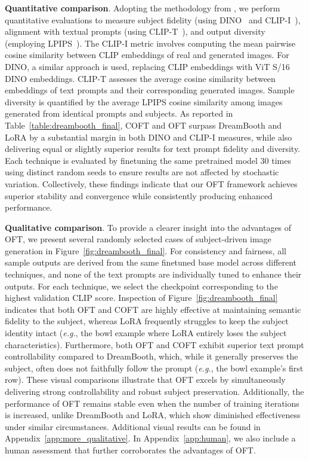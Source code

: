 \textbf{Quantitative comparison}. Adopting the methodology from \cite{ruiz2023dreambooth}, we perform quantitative evaluations to measure subject fidelity (using DINO~\cite{caron2021emerging} and CLIP-I~\cite{radford2021learning}), alignment with textual prompts (using CLIP-T~\cite{radford2021learning}), and output diversity (employing LPIPS~\cite{zhang2018unreasonable}). The CLIP-I metric involves computing the mean pairwise cosine similarity between CLIP embeddings of real and generated images. For DINO, a similar approach is used, replacing CLIP embeddings with ViT S/16 DINO embeddings. CLIP-T assesses the average cosine similarity between embeddings of text prompts and their corresponding generated images. Sample diversity is quantified by the average LPIPS cosine similarity among images generated from identical prompts and subjects. As reported in Table~\ref{table:dreambooth_final}, COFT and OFT surpass DreamBooth and LoRA by a substantial margin in both DINO and CLIP-I measures, while also delivering equal or slightly superior results for text prompt fidelity and diversity. Each technique is evaluated by finetuning the same pretrained model 30 times using distinct random seeds to ensure results are not affected by stochastic variation. Collectively, these findings indicate that our OFT framework achieves superior stability and convergence while consistently producing enhanced performance.

\textbf{Qualitative comparison}. To provide a clearer insight into the advantages of OFT, we present several randomly selected cases of subject-driven image generation in Figure~\ref{fig:dreambooth_final}. For consistency and fairness, all sample outputs are derived from the same finetuned base model across different techniques, and none of the text prompts are individually tuned to enhance their outputs. For each technique, we select the checkpoint corresponding to the highest validation CLIP score. Inspection of Figure~\ref{fig:dreambooth_final} indicates that both OFT and COFT are highly effective at maintaining semantic fidelity to the subject, whereas LoRA frequently struggles to keep the subject identity intact (\emph{e.g.}, the bowl example where LoRA entirely loses the subject characteristics). Furthermore, both OFT and COFT exhibit superior text prompt controllability compared to DreamBooth, which, while it generally preserves the subject, often does not faithfully follow the prompt (\emph{e.g.}, the bowl example’s first row). These visual comparisons illustrate that OFT excels by simultaneously delivering strong controllability and robust subject preservation. Additionally, the performance of OFT remains stable even when the number of training iterations is increased, unlike DreamBooth and LoRA, which show diminished effectiveness under similar circumstances. Additional visual results can be found in Appendix~\ref{app:more_qualitative}. In Appendix~\ref{app:human}, we also include a human assessment that further corroborates the advantages of OFT.

